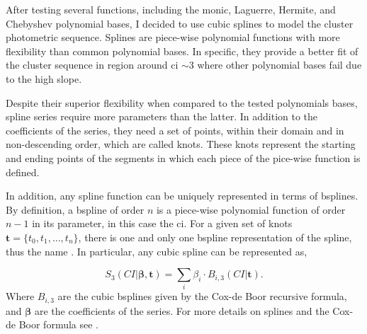 After testing several functions, including the monic, Laguerre, Hermite, and Chebyshev polynomial bases, I decided to use cubic splines to model the cluster photometric sequence. Splines are piece-wise polynomial functions with more flexibility than common polynomial bases. In specific, they provide a better fit of the cluster sequence in region around \gls{ci} $\sim 3$ where other polynomial bases fail due to the high slope. 

Despite their superior flexibility when compared to the tested polynomials bases, spline series require more parameters than the latter. In addition to the coefficients of the series, they need a set of points, within their domain and in non-descending order, which are called knots. These knots represent the starting and ending points of the segments in which each piece of the pice-wise function is defined.

In addition, any spline function can be uniquely represented in terms of \glspl{bspline}. By definition, a \gls{bspline} of order $n$ is a piece-wise polynomial function of order $n-1$ in its parameter, in this case the \gls{ci}. For a given set of knots $\mathbf{t}=\{t_0,t_1,...,t_n\}$, there is one and only one \gls{bspline} representation of the spline, thus the name .  In particular, any cubic spline can be represented as,

\begin{equation}
\label{eq:spline_cubic}
S_3(CI|\boldsymbol{\beta},\mathbf{t}) = \sum_i \beta_i\cdot B_{i,3}(CI|\mathbf{t}).
\end{equation}
Where $B_{i,3}$ are the cubic \glspl{bspline} given by the Cox-de Boor recursive formula, and $\boldsymbol{\beta}$ are the coefficients of the series. For more details on splines and the Cox-de Boor formula see \citet{deBoor1978}.

